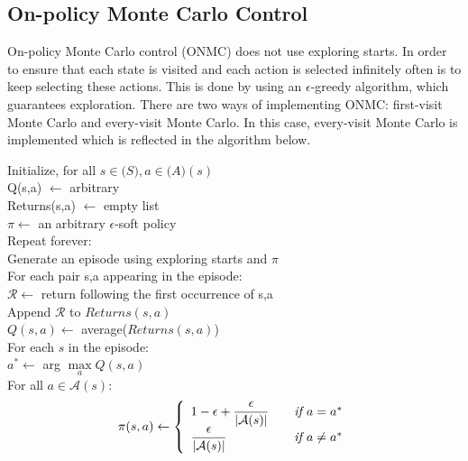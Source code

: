 \documentclass{article}
\newcommand{\tab}{\hspace{10mm}}
\newcommand{\dtab}{\hspace{20mm}}
\newcommand{\ttab}{\hspace{30mm}}
\newcommand{\qtab}{\hspace{40mm}}
\begin{document}
\subsection{On-policy Monte Carlo Control}
On-policy Monte Carlo control (ONMC) does not use exploring starts. In order to ensure that each state is visited and each action is selected infinitely often is to keep selecting these actions. This is done by using an $\epsilon$-greedy algorithm, which guarantees exploration. There are two ways of implementing ONMC: first-visit Monte Carlo and every-visit Monte Carlo. In this case, every-visit Monte Carlo is implemented which is reflected in the algorithm below. 

 
\begin{center}
\begin{mdframed}
\begin{algorithm}[H]
Initialize, for all $s \in \mathcal(S), a \in \mathcal(A)(s)$\\
\tab Q(s,a) $\leftarrow$ arbitrary \\
\tab Returns(s,a) $\leftarrow$ empty list \\
\tab $\pi \leftarrow$ an arbitrary $\epsilon$-soft policy \\
 
Repeat forever:\\
\tab Generate an episode using exploring starts and $\pi$\\
\tab For each pair s,a appearing in the episode:\\
\dtab $\mathcal{R} \leftarrow $ return following the first occurrence of s,a\\
\ttab Append $\mathcal{R}$ to $Returns(s,a)$\\
\ttab $Q(s,a) \leftarrow$ average($Returns(s,a)$)\\
\dtab For each $s$ in the episode:\\
\ttab $a^* \leftarrow$ arg $\max\limits_a Q(s,a)$\\
\ttab For all $a \in \mathcal{A}(s)$:\\

\qtab \[\pi(s,a) \leftarrow \left \{
\begin{array}{l l}
1-\epsilon + \dfrac{\epsilon}{|\mathcal{A}(s)|} & \quad \textit{if } a = a^* \\
\dfrac{\epsilon}{|\mathcal{A}(s)|} & \quad \textit{if } a \neq a^*
\end{array}\right.\]
\end{algorithm}
\end{mdframed}
\label{alg:OPMCC}
\end{center}
\end{document}
